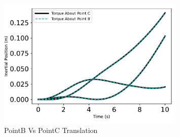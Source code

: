 \begin{figure}[htbp]\centerline{\includegraphics[width=0.8\textwidth]{AutoTeX/scPlusPointBVsPointCTranslation}}\caption{PointB Vs PointC Translation}\label{fig:scPlusPointBVsPointCTranslation}\end{figure}